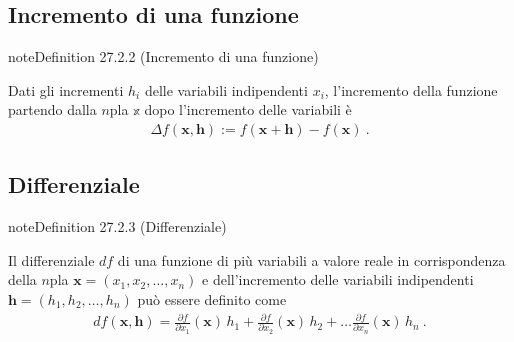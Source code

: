 \documentclass[letterpaper,10pt,italian]{jupyterBook}
\begin{document}
\subsection{Incremento di una funzione}
\label{\detokenize{ch/multivariable-calculus/derivatives:incremento-di-una-funzione}}\label{\detokenize{ch/multivariable-calculus/derivatives:multivariable-calculus-derivatives-increment}}\label{ch/multivariable-calculus/derivatives:definition-2}
\begin{sphinxadmonition}{note}{Definition 27.2.2 (Incremento di una funzione)}



\sphinxAtStartPar
Dati gli incrementi \(h_i\) delle variabili indipendenti \(x_i\), l’incremento della funzione partendo dalla \(n\)\sphinxhyphen{}pla \(\mathbb{x}\) dopo l’incremento delle variabili è
\begin{equation*}
\begin{split}\Delta f(\mathbf{x}, \mathbf{h}) := f(\mathbf{x} + \mathbf{h}) - f(\mathbf{x}) \ .\end{split}
\end{equation*}\end{sphinxadmonition}


\subsection{Differenziale}
\label{\detokenize{ch/multivariable-calculus/derivatives:differenziale}}\label{\detokenize{ch/multivariable-calculus/derivatives:multivariable-calculus-derivatives-differential}}\label{ch/multivariable-calculus/derivatives:definition-3}
\begin{sphinxadmonition}{note}{Definition 27.2.3 (Differenziale)}



\sphinxAtStartPar
Il differenziale \(d f\) di una funzione di più variabili a valore reale in corrispondenza della \(n\)\sphinxhyphen{}pla \(\mathbf{x} = (x_1, x_2, \dots, x_n)\) e dell’incremento delle variabili indipendenti \(\mathbf{h} = (h_1, h_2, \dots, h_n)\) può essere definito come
\begin{equation*}
\begin{split}d f (\mathbf{x}, \mathbf{h}) = \frac{\partial f}{\partial x_1}(\mathbf{x}) \,  h_1 +   
                                 \frac{\partial f}{\partial x_2}(\mathbf{x}) \,  h_2 + \dots
                                 \frac{\partial f}{\partial x_n}(\mathbf{x}) \,  h_n \ .  \end{split}
\end{equation*}\end{sphinxadmonition}
\end{document}
